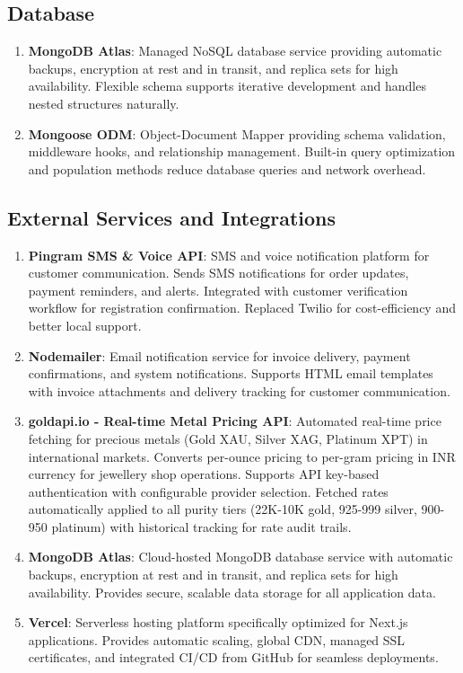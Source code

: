 \documentclass[12pt,a4paper]{report}
\begin{document}
\subsection{Database}
\begin{enumerate}[label=\roman*)]
    \item \textbf{MongoDB Atlas}: Managed NoSQL database service providing automatic backups, encryption at rest and in transit, and replica sets for high availability. Flexible schema supports iterative development and handles nested structures naturally.
    \item \textbf{Mongoose ODM}: Object-Document Mapper providing schema validation, middleware hooks, and relationship management. Built-in query optimization and population methods reduce database queries and network overhead.
\end{enumerate}

\subsection{External Services and Integrations}
\begin{enumerate}[label=\roman*)]
    \item \textbf{Pingram SMS \& Voice API}: SMS and voice notification platform for customer communication. Sends SMS notifications for order updates, payment reminders, and alerts. Integrated with customer verification workflow for registration confirmation. Replaced Twilio for cost-efficiency and better local support.
    \item \textbf{Nodemailer}: Email notification service for invoice delivery, payment confirmations, and system notifications. Supports HTML email templates with invoice attachments and delivery tracking for customer communication.
    \item \textbf{goldapi.io - Real-time Metal Pricing API}: Automated real-time price fetching for precious metals (Gold XAU, Silver XAG, Platinum XPT) in international markets. Converts per-ounce pricing to per-gram pricing in INR currency for jewellery shop operations. Supports API key-based authentication with configurable provider selection. Fetched rates automatically applied to all purity tiers (22K-10K gold, 925-999 silver, 900-950 platinum) with historical tracking for rate audit trails.
    \item \textbf{MongoDB Atlas}: Cloud-hosted MongoDB database service with automatic backups, encryption at rest and in transit, and replica sets for high availability. Provides secure, scalable data storage for all application data.
    \item \textbf{Vercel}: Serverless hosting platform specifically optimized for Next.js applications. Provides automatic scaling, global CDN, managed SSL certificates, and integrated CI/CD from GitHub for seamless deployments.
\end{enumerate}
\end{document}
